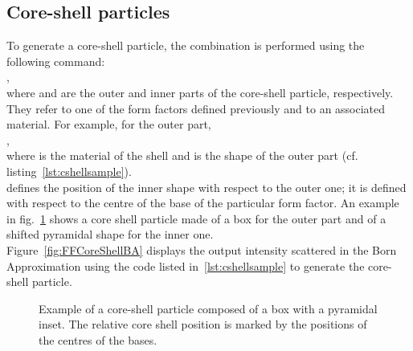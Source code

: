 \subsection{Core-shell particles} \label{subsec:CoreShell}
 To generate a core-shell particle, the combination is performed using the following command:\\
,\\
where  and  are the outer and inner parts of the core-shell particle, respectively. They refer to one of the form factors defined previously and to an associated material. For example, for the outer part,\\ ,\\ where  is the material of the shell and  is the shape of the outer part (cf. listing~\ref{lst:cshellsample}). \\  defines the position of the inner shape with respect to the outer one; it is defined with respect to the centre of the base of the particular form factor. An example in fig.~\ref{fig:coreshell} shows a core shell particle made of a box for the outer part and of a shifted pyramidal shape for the inner one.\\

Figure~\ref{fig:FFCoreShellBA} displays the output intensity scattered in the Born Approximation using the code listed in~\ref{lst:cshellsample} to generate the core-shell particle. 

\begin{figure}[ht]
\hfill
{}
\hfill
{}
\hfill
\caption{Example of a core-shell particle composed of a box with a pyramidal  inset. The relative core shell position is marked by the positions of the centres of the bases. }
\label{fig:coreshell}
\end{figure}

